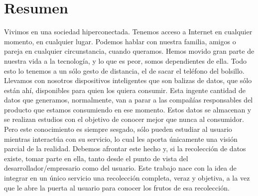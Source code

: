 \documentclass[12pt,a4paper,oneside]{book} %
\begin{document}
\chapter*{Resumen}
\thispagestyle{empty}
Vivimos en una sociedad hiperconectada. Tenemos acceso a Internet en cualquier momento, en cualquier lugar. Podemos hablar con nuestra familia, amigos o pareja en cualquier circunstancia, cuando queramos. Hemos movido gran parte de nuestra vida a la tecnología, y lo que es peor, somos dependientes de ella. 
\newline \newline 
Todo esto lo tenemos a un sólo gesto de distancia, el de sacar el teléfono del bolsillo. Llevamos con nosotros dispositivos inteligentes que son balizas de datos, que sólo están ahí, disponibles para quien los quiera consumir.
\newline \newline 
Esta ingente cantidad de datos que generamos, normalmente, van a parar a las compañías responsables del producto que estamos consumiendo en ese momento. Estos datos se almacenan y se realizan estudios con el objetivo de conocer mejor que nunca al consumidor. Pero este conocimiento es siempre sesgado, sólo pueden estudiar al usuario mientras interactúa con su servicio, lo cual les aporta únicamente una visión parcial de la realidad. 
\newline \newline 
Debemos afrontar este hecho y, si la recolección de datos existe, tomar parte en ella, tanto desde el punto de vista del desarrollador/empresario como del usuario. Este trabajo nace con la idea de integrar en un único servicio una recolección completa, veraz y objetiva, a la vez que le abre la puerta al usuario para conocer los frutos de esa recolección.
\thispagestyle{empty}
\setcounter{page}{1}
\tableofcontents
\listoffigures
\end{document}
